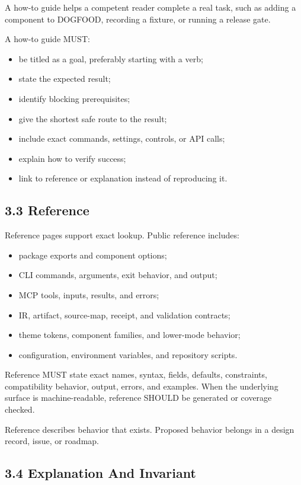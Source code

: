 A how-to guide helps a competent reader complete a real task, such as adding a component to DOGFOOD, recording a fixture, or running a release gate.

A how-to guide MUST:

\begin{itemize}
\tightlist
\item
  be titled as a goal, preferably starting with a verb;
\item
  state the expected result;
\item
  identify blocking prerequisites;
\item
  give the shortest safe route to the result;
\item
  include exact commands, settings, controls, or API calls;
\item
  explain how to verify success;
\item
  link to reference or explanation instead of reproducing it.
\end{itemize}

\subsection{3.3 Reference}\label{record-005-reference}

Reference pages support exact lookup. Public reference includes:

\begin{itemize}
\tightlist
\item
  package exports and component options;
\item
  CLI commands, arguments, exit behavior, and output;
\item
  MCP tools, inputs, results, and errors;
\item
  IR, artifact, source-map, receipt, and validation contracts;
\item
  theme tokens, component families, and lower-mode behavior;
\item
  configuration, environment variables, and repository scripts.
\end{itemize}

Reference MUST state exact names, syntax, fields, defaults, constraints, compatibility behavior, output, errors, and examples. When the underlying surface is machine-readable, reference SHOULD be generated or coverage checked.

Reference describes behavior that exists. Proposed behavior belongs in a design record, issue, or roadmap.

\subsection{3.4 Explanation And Invariant}\label{record-005-explanation-and-invariant}

